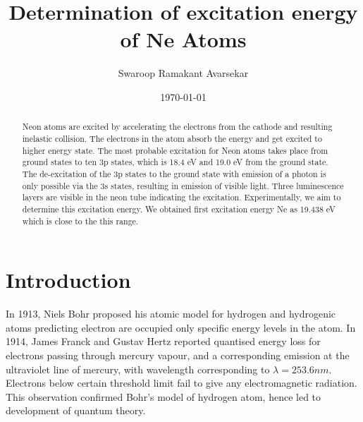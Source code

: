 \documentclass[a4paper, amsfonts, amssymb, amsmath, reprint, showkeys, nofootinbib, twoside]{revtex4-1}
\begin{document}
\title{Determination of excitation energy of Ne Atoms}
\author{Swaroop Ramakant Avarsekar}
\date{\today}

	
\begin{abstract}
Neon atoms are excited by accelerating the electrons from the cathode and resulting inelastic collision. The electrons in the atom absorb the energy and get excited to higher energy state. The most probable excitation for Neon atoms takes place from ground states to ten 3p states, which is 18.4 eV and 19.0 eV from the ground state. The de-excitation of the 3p states to the ground state with emission of a photon is only possible via the 3s states, resulting in emission of visible light. Three luminescence layers are visible in the neon tube indicating the excitation. Experimentally, we aim to determine this excitation energy. We obtained first excitation energy Ne as 19.438 eV which is close to the this range.
\end{abstract}
	
	
\maketitle

\section{Introduction}
In 1913, Niels Bohr proposed his atomic model for hydrogen and hydrogenic atoms predicting electron are occupied only specific energy levels in the atom. In 1914, James Franck and Gustav Hertz reported quantised energy loss for electrons passing through mercury vapour, and a corresponding emission at the ultraviolet line of mercury, with wavelength corresponding to $\lambda=253.6 nm$. Electrons below certain threshold limit fail to give any electromagnetic radiation. This observation confirmed Bohr's model of hydrogen atom, hence led to development of quantum theory.
\end{document}
